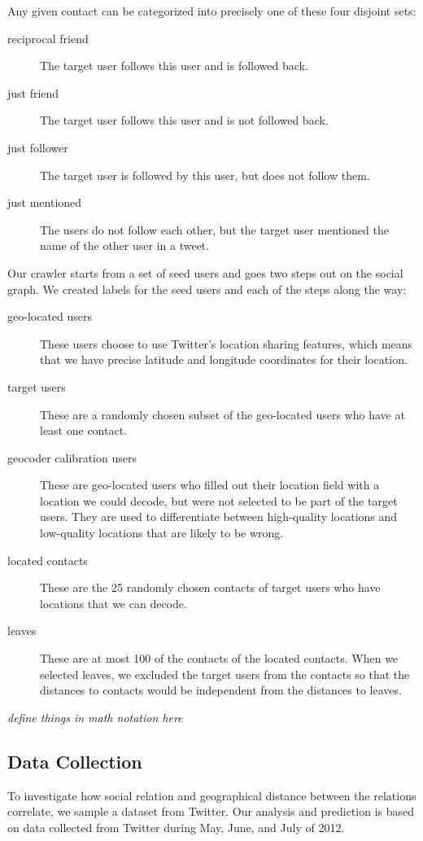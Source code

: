 \documentclass[letterpaper]{article}
\newcommand{\jam}[1]{\emph{#1}}
\newcommand{\flsec}[1]{\subsection{#1}}
\begin{document}
Any given contact can be categorized into precisely one of these four disjoint
sets:
\begin{description}
\item[reciprocal friend] The target user follows this user and is followed
    back.
\item[just friend] The target user follows this user and is not followed
    back.
\item[just follower] The target user is followed by this user, but does
    not follow them.
\item[just mentioned] The users do not follow each other, but the target
    user mentioned the name of the other user in a tweet.
\end{description}

Our crawler starts from a set of seed users and goes two steps out on the
social graph.
%
We created labels for the seed users and each of the steps along the way:

\begin{description}
\item[geo-located users] These users choose to use Twitter's location sharing
    features, which means that we have precise latitude and longitude
    coordinates for their location.
\item[target users] These are a randomly chosen subset of the geo-located users
    who have at least one contact.
\item[geocoder calibration users] These are geo-located users who filled out their
    location field with a location we could decode, but were not selected to be
    part of the target users. They are used to differentiate between
    high-quality locations and low-quality locations that are likely to be
    wrong.
\item[located contacts] These are the 25 randomly chosen contacts of
    target users who have locations that we can decode.
\item[leaves] These are at most 100 of the contacts of the located contacts.
    When we selected leaves, we excluded the target users from the contacts so
    that the distances to contacts would be independent from the distances to
    leaves.
\end{description}

\jam{define things in math notation here}

\flsec{Data Collection}
To investigate how social relation and geographical distance between the
relations correlate, we sample a dataset from Twitter.
%
Our analysis and prediction is based on data collected from Twitter during
May, June, and July of 2012.
\end{document}
